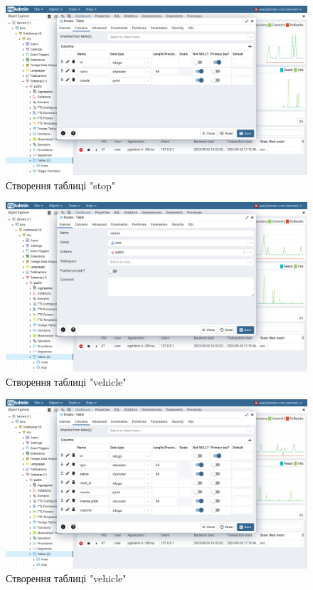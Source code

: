 \documentclass[14pt]{extreport}
\begin{document}
\begin{normalsize}
	\begin{figure}[H]
		\centering
		\includegraphics[scale=0.35]{23}
		\caption{Створення таблиці "stop"}
	\end{figure}

	\begin{figure}[H]
		\centering
		\includegraphics[scale=0.35]{24}
		\caption{Створення таблиці "vehicle"}
	\end{figure}
	
	\begin{figure}[H]
		\centering
		\includegraphics[scale=0.35]{25}
		\caption{Створення таблиці "vehicle"}
	\end{figure}
	

\end{normalsize}
\end{document}
